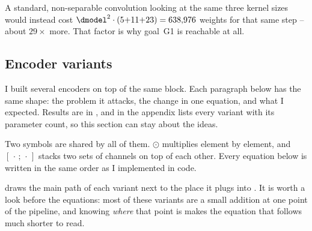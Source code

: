 A standard, non-separable convolution looking at the same three kernel sizes would instead cost
$\dmodel^2 \cdot (5{+}11{+}23) = 638{,}976$ weights for that same step -- about $29\times$ more.
That factor is why goal~G1 is reachable at all.

\subsection{Encoder variants}
\label{sec:arch:variants}

I built several encoders on top of the same block. Each paragraph below has the same shape: the
problem it attacks, the change in one equation, and what I expected. Results are in
, and  in the appendix lists every variant with its
parameter count, so this section can stay about the ideas.

Two symbols are shared by all of them. $\odot$ multiplies element by element, and $[\,\cdot\,;\,
\cdot\,]$ stacks two sets of channels on top of each other. Every equation below is written in the
same order as I implemented in code.

 draws the main path of each variant next to the place it plugs into
. It is worth a look before the equations: most of these variants are a small
addition at one point of the pipeline, and knowing \emph{where} that point is makes the equation
that follows much shorter to read.

